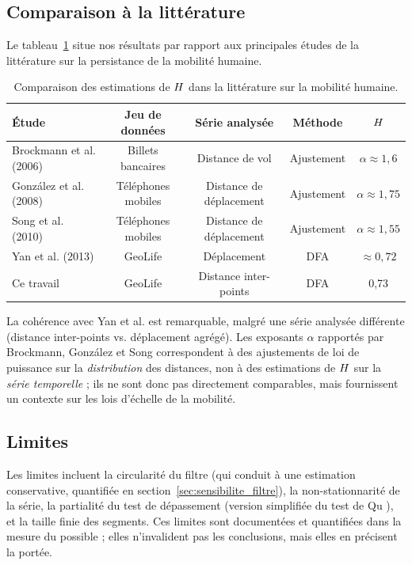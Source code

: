 \subsection{Comparaison à la littérature}
\label{sec:comparaison_litterature}
Le tableau~\ref{tab:comparaison_litterature} situe nos résultats par rapport aux principales études de la littérature sur la persistance de la mobilité humaine.

\begin{table}[H]
\centering
\caption{Comparaison des estimations de $H$ dans la littérature sur la mobilité humaine.}
\label{tab:comparaison_litterature}
\begin{tabular}{lcccc}
\toprule
Étude & Jeu de données & Série analysée & Méthode & $H$ \\
\midrule
Brockmann et al. (2006) \cite{brockmann2006} & Billets bancaires & Distance de vol & Ajustement & $\alpha \approx 1{,}6$ \\
González et al. (2008) \cite{gonzalez2008} & Téléphones mobiles & Distance de déplacement & Ajustement & $\alpha \approx 1{,}75$ \\
Song et al. (2010) \cite{song2010} & Téléphones mobiles & Distance de déplacement & Ajustement & $\alpha \approx 1{,}55$ \\
Yan et al. (2013) \cite{yan2013} & GeoLife & Déplacement & DFA & $\approx 0{,}72$ \\
Ce travail & GeoLife & Distance inter-points & DFA & 0,73 \\
\bottomrule
\end{tabular}
\end{table}

La cohérence avec Yan et al. \cite{yan2013} est remarquable, malgré une série analysée différente (distance inter-points vs. déplacement agrégé). Les exposants $\alpha$ rapportés par Brockmann, González et Song correspondent à des ajustements de loi de puissance sur la \emph{distribution} des distances, non à des estimations de $H$ sur la \emph{série temporelle} ; ils ne sont donc pas directement comparables, mais fournissent un contexte sur les lois d'échelle de la mobilité.

\subsection{Limites}
Les limites incluent la circularité du filtre (qui conduit à une estimation conservative, quantifiée en section~\ref{sec:sensibilite_filtre}), la non-stationnarité de la série, la partialité du test de dépassement (version simplifiée du test de Qu \cite{qu2011}), et la taille finie des segments. Ces limites sont documentées et quantifiées dans la mesure du possible ; elles n'invalident pas les conclusions, mais elles en précisent la portée.

